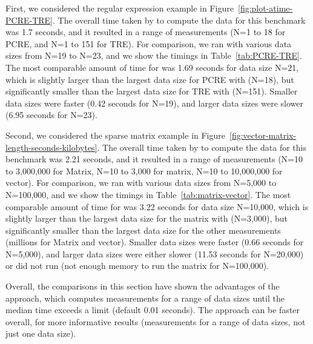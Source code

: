 First, we considered the regular expression example in Figure~\ref{fig:plot-atime-PCRE-TRE}.
The overall time taken by  to compute the data for this benchmark was 1.7 seconds, and it resulted in a range of measurements (N=1 to 18 for PCRE, and N=1 to 151 for TRE).
For comparison, we ran  with various data sizes from N=19 to N=23, and we show the timings in Table~\ref{tab:PCRE-TRE}.
The most comparable amount of time for  was 1.69 seconds for data size N=21, which is slightly larger than the largest data size for PCRE with  (N=18), but significantly smaller than the largest data size for TRE with  (N=151).
Smaller data sizes were faster (0.42 seconds for N=19), and larger data sizes were slower (6.95 seconds for N=23).

Second, we considered the sparse matrix example in Figure~\ref{fig:vector-matrix-length-seconds-kilobytes}.
The overall time taken by  to compute the data for this benchmark was 2.21 seconds, and it resulted in a range of measurements (N=10 to 3,000,000 for Matrix, N=10 to 3,000 for matrix, N=10 to 10,000,000 for vector).
For comparison, we ran  with various data sizes from N=5,000 to N=100,000, and we show the timings in Table~\ref{tab:matrix-vector}.
The most comparable amount of time for  was 3.22 seconds for data size N=10,000, which is slightly larger than the largest data size for the matrix with  (N=3,000), but significantly smaller than the largest data size for the other  measurements (millions for Matrix and vector).
Smaller data sizes were faster (0.66 seconds for N=5,000), and larger data sizes were either slower (11.53 seconds for N=20,000) or did not run (not enough memory to run the matrix for N=100,000).

Overall, the comparisons in this section have shown the advantages of the  approach, which computes measurements for a range of data sizes until the median time exceeds a limit (default 0.01 seconds).
The  approach can be faster overall, for more informative results (measurements for a range of data sizes, not just one data size).

